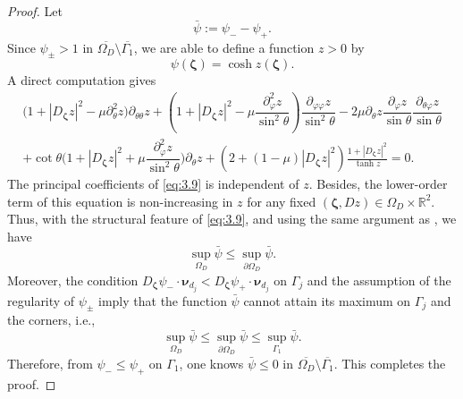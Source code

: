 \documentclass[reqno,12pt]{amsart}
\numberwithin{equation}{section}
\begin{document}
\begin{proof}
    Let
	\begin{equation*}
		\bar{\psi}:=\psi_- -\psi_+.
	\end{equation*}
    Since ${\psi}_{\pm}> 1$ in $\overline{\Omega_{D}}\setminus\overline{\Gamma_1}$, we are able to define a function $z>0$ by
	\begin{equation}\label{eq:3.6}
		{\psi}(\bm{\zeta})=\cosh z(\bm{\zeta}).
	\end{equation}
    A direct computation gives
	\begin{multline}\label{eq:3.9}	
    \big(1+|D_{\bm{\zeta}}z|^2-\mu\partial^{2}_\theta z\big)\partial_{\theta\theta}z+(1+|D_{\bm{\zeta}}z|^2-\mu\dfrac{\partial^2_\varphi z}{\sin^2\theta})\dfrac{\partial_{\varphi\varphi} z}{\sin^2\theta}-2\mu\partial_\theta z\dfrac{ \partial_\varphi z}{\sin\theta}\dfrac{\partial_{\theta\varphi}z}{\sin\theta}\\+
    \cot\theta\big(1+|D_{\bm{\zeta}}z|^2+\mu\dfrac{\partial^2_\varphi z}{\sin^2\theta}\big)\partial_\theta z+(2+(1-\mu)|D_{\bm{\zeta}}z|^2)\frac{1+|D_{\bm{\zeta}}z|^2}{\tanh z}=0.
	\end{multline}
    The principal coefficients of \eqref{eq:3.9} is independent of $z$. Besides, the lower-order term of this equation is non-increasing in $z$ for any fixed $(\bm{\zeta},Dz)\in \Omega_{D}\times \mathbb{R}^{2}$. Thus, with the structural feature of \eqref{eq:3.9}, and using the same argument as \cite[Lemma \ref{lemma: comparison principle}]{LY22}, we have 
	\begin{equation}\label{eq: for assert}
\sup_{\Omega_D}\bar{\psi}\leq\sup_{\partial\Omega_D}\bar{\psi}.
	\end{equation}
    Moreover, the condition $D_{\bm{\zeta}}\psi_-\cdot\bm{\nu}_{d_j}<D_{\bm{\zeta}}\psi_+\cdot\bm{\nu}_{d_j}$ on $\Gamma_j$ and the assumption of the regularity of  ${\psi}_{\pm}$ imply that the function $\bar{\psi}$ cannot attain its maximum on $\Gamma_j$ and the corners, i.e.,
    \begin{equation}\label{eq:bd est}		  \sup_{\Omega_D}\bar{\psi}\leq\sup_{\partial\Omega_D}\bar{\psi}\leq\sup_{\Gamma_1}\bar{\psi}.
	\end{equation}
  Therefore, from $\psi_-\leq\psi_+$ on $\Gamma_1$, one knows $\bar{\psi}\leq 0$ in $\overline{\Omega_{D}}\setminus\overline{\Gamma_1}$. This completes the proof.
\end{proof}
\end{document}

